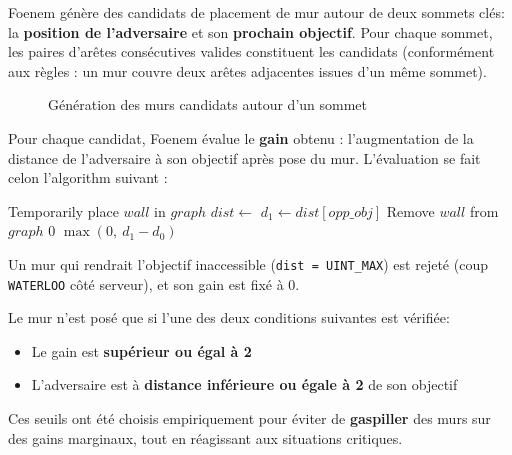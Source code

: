 \documentclass[12pt,a4paper]{article}
\begin{document}
Foenem génère des candidats de placement de mur autour de deux sommets clés: 
la \textbf{position de l'adversaire} et son \textbf{prochain objectif}. Pour 
chaque sommet, les paires d'arêtes consécutives valides constituent les 
candidats (conformément aux règles : un mur couvre deux arêtes adjacentes 
issues d'un même sommet).

\begin{figure}[h]
\centering
\caption{Génération des murs candidats autour d'un sommet}
\end{figure}


Pour chaque candidat, Foenem évalue le \textbf{gain} obtenu : l'augmentation 
de la distance de l'adversaire à son objectif après pose du mur. L'évaluation 
se fait celon l'algorithm suivant :

\begin{algorithm}
\caption{Evaluation of a candidate wall gain}
\begin{algorithmic}[1]
    \State Temporarily place $wall$ in $graph$
    \State $dist \gets$ 
    \State $d_1 \gets dist[opp\_obj]$
    \State Remove $wall$ from $graph$
     \State \Return $0$ \EndIf
    \State \Return $\max(0,\ d_1 - d_0)$
\EndFunction
\end{algorithmic}
\end{algorithm}


Un mur qui rendrait l'objectif inaccessible (\texttt{dist = UINT\_MAX}) est 
rejeté (coup \texttt{WATERLOO} côté serveur), et son gain est fixé à 0.

Le mur n'est posé que si l'une des deux conditions suivantes est vérifiée:

\begin{itemize}
    \item Le gain est \textbf{supérieur ou égal à 2}
    \item L'adversaire est à \textbf{distance inférieure ou égale à 2} 
    de son objectif 
\end{itemize}

\noindent Ces seuils ont été choisis empiriquement pour éviter de \textbf{gaspiller} 
des murs sur des gains marginaux, tout en réagissant aux situations critiques.
\end{document}
